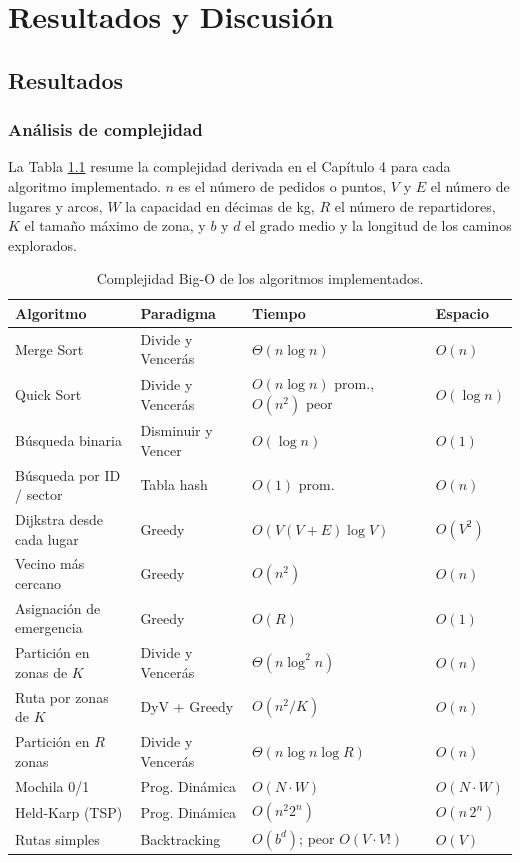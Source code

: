 \chapter{Resultados y Discusión}

\section{Resultados}

\subsection{Análisis de complejidad}

La Tabla \ref{tab:complejidad} resume la complejidad derivada en el Capítulo 4 para cada algoritmo implementado. $n$ es el número de pedidos o puntos, $V$ y $E$ el número de lugares y arcos, $W$ la capacidad en décimas de kg, $R$ el número de repartidores, $K$ el tamaño máximo de zona, y $b$ y $d$ el grado medio y la longitud de los caminos explorados.

\begin{table}[h]
    \centering
    \caption{Complejidad Big-O de los algoritmos implementados.}
    \label{tab:complejidad}
    \small
    \begin{tabular}{llll}
        \toprule
        \textbf{Algoritmo} & \textbf{Paradigma} & \textbf{Tiempo} & \textbf{Espacio} \\
        \midrule
        Merge Sort                 & Divide y Vencerás & $\Theta(n\log n)$ & $O(n)$ \\
        Quick Sort                 & Divide y Vencerás & $O(n\log n)$ prom., $O(n^2)$ peor & $O(\log n)$ \\
        Búsqueda binaria           & Disminuir y Vencer & $O(\log n)$ & $O(1)$ \\
        Búsqueda por ID / sector   & Tabla hash        & $O(1)$ prom. & $O(n)$ \\
        Dijkstra desde cada lugar  & Greedy            & $O(V(V+E)\log V)$ & $O(V^2)$ \\
        Vecino más cercano         & Greedy            & $O(n^2)$ & $O(n)$ \\
        Asignación de emergencia   & Greedy            & $O(R)$ & $O(1)$ \\
        Partición en zonas de $K$  & Divide y Vencerás & $\Theta(n\log^2 n)$ & $O(n)$ \\
        Ruta por zonas de $K$      & DyV + Greedy      & $O(n^2/K)$ & $O(n)$ \\
        Partición en $R$ zonas     & Divide y Vencerás & $\Theta(n\log n\log R)$ & $O(n)$ \\
        Mochila 0/1                & Prog. Dinámica    & $O(N\cdot W)$ & $O(N\cdot W)$ \\
        Held-Karp (TSP)            & Prog. Dinámica    & $O(n^2 2^n)$ & $O(n\,2^n)$ \\
        Rutas simples              & Backtracking      & $O(b^d)$; peor $O(V\cdot V!)$ & $O(V)$ \\
        \bottomrule
    \end{tabular}
\end{table}

